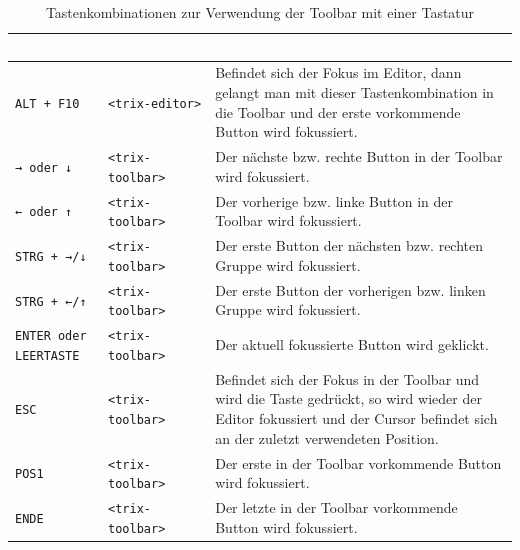 \begin{table}[H]
	\begin{center}
	\begin{tabularx}{\textwidth}{| p{2.5cm} | l | X |}
		\hline
		\cellcolor{Gray}\textcolor{White}{Tasten} & \cellcolor{Gray}\textcolor{White}{Fokusbereich} & \cellcolor{Gray}\textcolor{White}{Beschreibung} \\
		\hline
		\texttt{ALT + F10} & \texttt{<trix-editor>} & Befindet sich der Fokus im Editor, dann gelangt man mit dieser Tastenkombination in die Toolbar
		und der erste vorkommende Button wird fokussiert.\\
		\hline
		\texttt{→ oder ↓} & \texttt{<trix-toolbar>} & Der nächste bzw. rechte Button in der Toolbar wird fokussiert.\\
		\hline
		\texttt{← oder ↑} & \texttt{<trix-toolbar>} & Der vorherige bzw. linke Button in der Toolbar wird fokussiert.\\
		\hline
		\texttt{STRG + →/↓} & \texttt{<trix-toolbar>} & Der erste Button der nächsten bzw. rechten Gruppe wird fokussiert.\\
		\hline
		\texttt{STRG + ←/↑} & \texttt{<trix-toolbar>} & Der erste Button der vorherigen bzw. linken Gruppe wird fokussiert.\\
		\hline
		\texttt{ENTER oder LEERTASTE} & \texttt{<trix-toolbar>} & Der aktuell fokussierte Button wird geklickt.\\
		\hline
		\texttt{ESC} & \texttt{<trix-toolbar>} & Befindet sich der Fokus in der Toolbar und wird die Taste gedrückt, so wird wieder der Editor fokussiert
		und der Cursor befindet sich an der zuletzt verwendeten Position.\\
		\hline
		\texttt{POS1} & \texttt{<trix-toolbar>} & Der erste in der Toolbar vorkommende Button wird fokussiert.\\
		\hline
		\texttt{ENDE} & \texttt{<trix-toolbar>} & Der letzte in der Toolbar vorkommende Button wird fokussiert.\\
		\hline
	\end{tabularx}
	\end{center}
	\caption{Tastenkombinationen zur Verwendung der Toolbar mit einer Tastatur}
\end{table}

